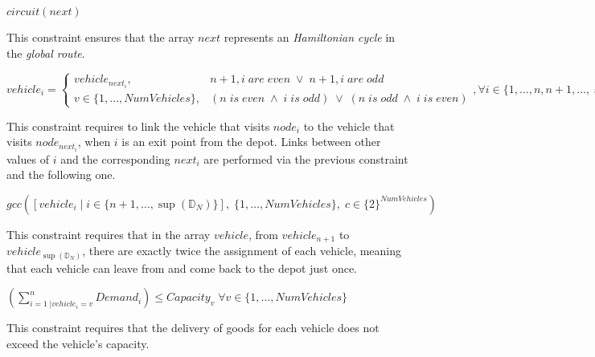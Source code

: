 \documentclass[../main.tex]{subfiles}
\begin{document}
\begin{center} %
    \begin{math}
        circuit(next)
    \end{math}
\end{center}
This constraint ensures that the array $next$ represents an \textit{Hamiltonian cycle} in the \textit{global route}.

\begin{center} %
    \begin{math}
        vehicle_i =
        \begin{cases}
            vehicle_{next_i}, & \text{$n+1, i$} \; are \; even \; \vee \; \text{$n+1, i$} \; are \; odd\\
            \text{$v \in \{1,\dots,NumVehicles\}$}, & (\text{$n$} \; is \; even \; \wedge \; \text{$i$} \; is \; odd ) \; \vee \; (\text{$n$} \; is \; odd \; \wedge \; \text{$i$} \; is \; even )
        \end{cases},
        \forall i \in \{1,\dots,n,n+1,\dots,\sup{}(\mathbb{D}_N) - 1\}
    \end{math}
\end{center}
This constraint requires to link the vehicle that visits $node_i$ to the vehicle that visits $node_{next_i}$, when $i$ is an exit point from the depot.
Links between other values of $i$ and the corresponding $next_i$ are performed via the previous constraint and the following one.

\begin{center} %
    \begin{math}
        gcc([vehicle_i \; | \; i \in \{n+1,\dots,\sup{}(\mathbb{D}_N)\}], \; \{1,\dots,NumVehicles\}, \; c \in \{2\}^{NumVehicles})
    \end{math}
\end{center}
This constraint requires that in the array $vehicle$, from $vehicle_{n+1}$ to $vehicle_{\sup{}(\mathbb{D}_N)}$, there are exactly twice the assignment of each vehicle, meaning that each vehicle can leave from and come back to the depot just once.

\begin{center} %
    \begin{math}
        (\sum_{i = 1 \; | vehicle_i = v}^n{Demand_i}) \leq Capacity_v \; \forall v \in \{1,\dots,NumVehicles\}
    \end{math}
\end{center}
This constraint requires that the delivery of goods for each vehicle does not exceed the vehicle's capacity.
\end{document}

